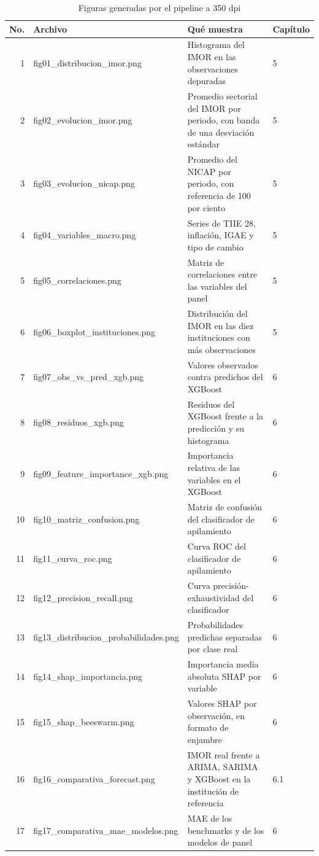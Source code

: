 \begin{table}[H]
\centering
\caption{Figuras generadas por el pipeline a 350 dpi}
\label{tab:met_figuras}
\small
\begin{tabularx}{\textwidth}{rp{4.8cm}Xp{1.6cm}}
\toprule
\textbf{No.} & \textbf{Archivo} & \textbf{Qué muestra} & \textbf{Capítulo} \\
\midrule
1 & fig01\_distribucion\_imor.png & Histograma del IMOR en las observaciones depuradas & 5 \\
2 & fig02\_evolucion\_imor.png & Promedio sectorial del IMOR por periodo, con banda de una desviación estándar & 5 \\
3 & fig03\_evolucion\_nicap.png & Promedio del NICAP por periodo, con referencia de 100 por ciento & 5 \\
4 & fig04\_variables\_macro.png & Series de TIIE 28, inflación, IGAE y tipo de cambio & 5 \\
5 & fig05\_correlaciones.png & Matriz de correlaciones entre las variables del panel & 5 \\
6 & fig06\_boxplot\_instituciones.png & Distribución del IMOR en las diez instituciones con más observaciones & 5 \\
7 & fig07\_obs\_vs\_pred\_xgb.png & Valores observados contra predichos del XGBoost & 6 \\
8 & fig08\_residuos\_xgb.png & Residuos del XGBoost frente a la predicción y su histograma & 6 \\
9 & fig09\_feature\_importance\_xgb.png & Importancia relativa de las variables en el XGBoost & 6 \\
10 & fig10\_matriz\_confusion.png & Matriz de confusión del clasificador de apilamiento & 6 \\
11 & fig11\_curva\_roc.png & Curva ROC del clasificador de apilamiento & 6 \\
12 & fig12\_precision\_recall.png & Curva precisión-exhaustividad del clasificador & 6 \\
13 & fig13\_distribucion\_probabilidades.png & Probabilidades predichas separadas por clase real & 6 \\
14 & fig14\_shap\_importancia.png & Importancia media absoluta SHAP por variable & 6 \\
15 & fig15\_shap\_beeswarm.png & Valores SHAP por observación, en formato de enjambre & 6 \\
16 & fig16\_comparativa\_forecast.png & IMOR real frente a ARIMA, SARIMA y XGBoost en la institución de referencia & 6.1 \\
17 & fig17\_comparativa\_mae\_modelos.png & MAE de los benchmarks y de los modelos de panel & 6 \\
\bottomrule
\end{tabularx}
\end{table}

